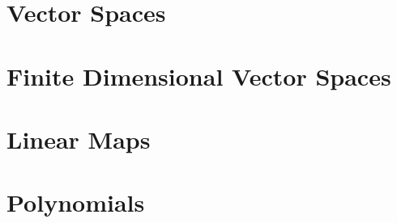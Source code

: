 \documentclass[11pt]{report}
\begin{document}

  

  \chapter{Vector Spaces}
  
  
   \clearpage
  
   \clearpage

  \chapter{Finite Dimensional Vector Spaces}
  
   \clearpage
  
   \clearpage
  
   \clearpage

  \chapter{Linear Maps}
  
   \clearpage

  
   \clearpage

  
   \clearpage

  
   \clearpage

  
   \clearpage

  
   \clearpage

  \chapter{Polynomials}
   \clearpage %
   \clearpage
\end{document}
